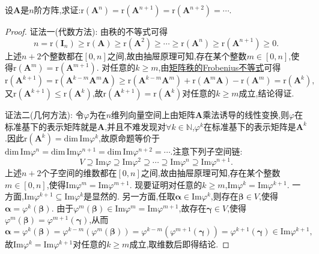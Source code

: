 \documentclass[../../main.tex]{subfiles}%
\begin{document}
\begin{proposition}\label{proposition:矩阵n次方幂秩等式}
设\(\boldsymbol{A}\)是\(n\)阶方阵,求证:\(\text{r}(\boldsymbol{A}^n)=\text{r}(\boldsymbol{A}^{n + 1})=\text{r}(\boldsymbol{A}^{n + 2})=\cdots\).
\end{proposition}
\begin{proof}

{\color{blue}证法一(代数方法):} 由秩的不等式可得
\[
n=\text{r}(\boldsymbol{I}_n)\geqslant \text{r}(\boldsymbol{A})\geqslant \text{r}(\boldsymbol{A}^2)\geqslant \cdots\geqslant \text{r}(\boldsymbol{A}^n)\geqslant \text{r}(\boldsymbol{A}^{n + 1})\geqslant  0.
\]
上述\(n + 2\)个整数都在\([0,n]\)之间,故由抽屉原理可知,存在某个整数\(m\in[0,n]\),使得\(\text{r}(\boldsymbol{A}^m)=\text{r}(\boldsymbol{A}^{m + 1})\). 对任意的\(k\geqslant  m\),由\hyperref[proposition:Frobenius(弗罗贝尼乌斯)不等式]{矩阵秩的Frobenius不等式}可得
\[
\text{r}(\boldsymbol{A}^{k + 1})=\text{r}(\boldsymbol{A}^{k - m}\boldsymbol{A}^m\boldsymbol{A})\geqslant \text{r}(\boldsymbol{A}^{k - m}\boldsymbol{A}^m)+\text{r}(\boldsymbol{A}^m\boldsymbol{A})-\text{r}(\boldsymbol{A}^m)=\text{r}(\boldsymbol{A}^k),
\]
又\(\text{r}(\boldsymbol{A}^{k + 1})\leqslant \text{r}(\boldsymbol{A}^k)\),故\(\text{r}(\boldsymbol{A}^{k + 1})=\text{r}(\boldsymbol{A}^k)\)对任意的\(k\geqslant  m\)成立,结论得证.

{\color{blue}证法二(几何方法):} 令\(\varphi\)为在\(n\)维列向量空间上由矩阵\(\boldsymbol{A}\)乘法诱导的线性变换,则\(\varphi\)在标准基下的表示矩阵就是\(\boldsymbol{A}\),并且不难发现对\(\forall k\in \mathbb{N}\),\(\varphi^k\)在标准基下的表示矩阵是\(\boldsymbol{A}^k\).因此\(\mathrm{r}(\boldsymbol{A}^k) = \mathrm{dim} \,\mathrm{Im}\varphi^k\),故原命题等价于$\mathrm{dim}\,\mathrm{Im}\varphi ^n=\mathrm{dim}\,\mathrm{Im}\varphi ^{n+1}=\mathrm{dim}\,\mathrm{Im}\varphi ^{n+2}=\cdots 
$.注意下列子空间链:
\[
V\supseteq\text{Im}\varphi\supseteq\text{Im}\varphi^2\supseteq\cdots\supseteq\text{Im}\varphi^n\supseteq\text{Im}\varphi^{n + 1}.
\]
上述\(n + 2\)个子空间的维数都在\([0,n]\)之间,故由抽屉原理可知,存在某个整数\(m\in[0,n]\),使得\(\text{Im}\varphi^m=\text{Im}\varphi^{m + 1}\). 现要证明对任意的\(k\geqslant  m\),\(\text{Im}\varphi^k=\text{Im}\varphi^{k + 1}\). 一方面,\(\text{Im}\varphi^{k + 1}\subseteq\text{Im}\varphi^k\)是显然的. 另一方面,任取\(\boldsymbol{\alpha}\in\text{Im}\varphi^k\),则存在\(\boldsymbol{\beta}\in V\),使得\(\boldsymbol{\alpha}=\varphi^k(\boldsymbol{\beta})\). 由于\(\varphi^m(\boldsymbol{\beta})\in\text{Im}\varphi^m=\text{Im}\varphi^{m + 1}\),故存在\(\boldsymbol{\gamma}\in V\),使得\(\varphi^m(\boldsymbol{\beta})=\varphi^{m + 1}(\boldsymbol{\gamma})\),从而
\[
\boldsymbol{\alpha}=\varphi^k(\boldsymbol{\beta})=\varphi^{k - m}(\varphi^m(\boldsymbol{\beta}))=\varphi^{k - m}(\varphi^{m + 1}(\boldsymbol{\gamma}))=\varphi^{k + 1}(\boldsymbol{\gamma})\in\text{Im}\varphi^{k + 1},
\]
故\(\text{Im}\varphi^k=\text{Im}\varphi^{k + 1}\)对任意的\(k\geqslant  m\)成立,取维数后即得结论. 

\end{proof}
\end{document}
